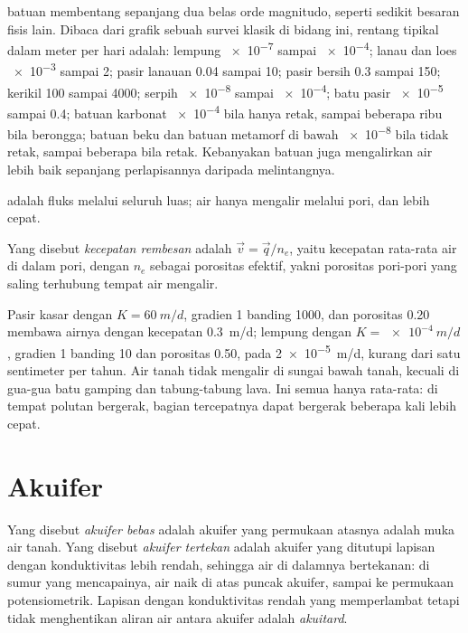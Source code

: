  batuan membentang sepanjang dua belas orde
magnitudo, seperti sedikit besaran fisis lain. Dibaca dari grafik sebuah
survei klasik di bidang ini, rentang tipikal dalam meter per hari adalah: lempung
\num{e-7} sampai \num{e-4}; lanau dan loes \num{e-3} sampai 2; pasir lanauan 0.04 sampai
10; pasir bersih 0.3 sampai 150; kerikil 100 sampai 4000; serpih \num{e-8} sampai
\num{e-4}; batu pasir \num{e-5} sampai 0.4; batuan karbonat \num{e-4} bila
hanya retak, sampai beberapa ribu bila berongga; batuan beku dan batuan
metamorf di bawah \num{e-8} bila tidak retak, sampai beberapa bila
retak. Kebanyakan batuan juga mengalirkan air lebih baik sepanjang
perlapisannya daripada melintangnya.

 adalah fluks melalui seluruh luas; air hanya mengalir
melalui pori, dan lebih cepat.

\begin{definition}\label{def:b3:hydrogeology:seepage}
Yang disebut \emph{kecepatan rembesan} adalah $\vec v = \vec
q/n_e$, yaitu kecepatan rata-rata air di dalam pori, dengan $n_e$ sebagai
porositas efektif, yakni porositas pori-pori yang saling terhubung tempat air
mengalir.
\end{definition}

Pasir kasar dengan $K = \qty{60}{m/d}$, gradien 1 banding 1000, dan
porositas 0.20 membawa airnya dengan kecepatan \qty{0.3}{m/d}; lempung dengan $K =
\qty{e-4}{m/d}$, gradien 1 banding 10 dan porositas 0.50, pada
\qty{2e-5}{m/d}, kurang dari satu sentimeter per tahun. Air tanah tidak mengalir
di sungai bawah tanah, kecuali di gua-gua batu gamping dan tabung-tabung
lava. Ini semua hanya rata-rata: di tempat polutan bergerak, bagian
tercepatnya dapat bergerak beberapa kali lebih cepat.

\section{Akuifer}\label{sec:b3:hydrogeology:aquifers}

\begin{definition}\label{def:b3:hydrogeology:aquifer-types}
Yang disebut \emph{akuifer bebas} adalah akuifer yang
permukaan atasnya adalah muka air tanah. Yang disebut \emph{akuifer
tertekan} adalah akuifer yang ditutupi lapisan dengan
konduktivitas lebih rendah, sehingga air di dalamnya bertekanan: di sumur
yang mencapainya, air naik di atas puncak akuifer, sampai ke
permukaan potensiometrik. Lapisan dengan konduktivitas rendah yang memperlambat tetapi tidak
menghentikan aliran air antara akuifer adalah
\emph{akuitard}.
\end{definition}

